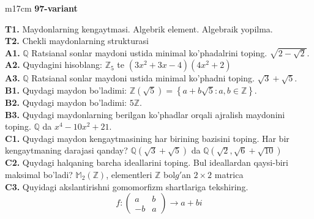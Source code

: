 \documentclass{article}
\begin{document}
\begin{tabular}{m{17cm}}
\textbf{97-variant}
\newline

\textbf{T1.} Maydonlarning kengaytmasi. Algebrik element. Algebraik yopilma. \\
\textbf{T2.} Chekli maydonlarning strukturasi \\
\textbf{A1.} \(\mathbb{Q}\) Ratsianal sonlar maydoni ustida minimal ko'phadalrini toping.
\(\sqrt{2 - \sqrt{2}}\). \\
\textbf{A2.} Quydagini hisoblang:
\(\mathbb{Z}_{5}\) te \(\left( 3x^{2} + 3x - 4 \right)\left( 4x^{2} + 2 \right)\) \\
\textbf{A3.} \(\mathbb{Q}\) Ratsianal sonlar maydoni ustida minimal ko'phadni toping.
\(\sqrt{3} + \sqrt{5}\). \\
\textbf{B1.} Quydagi maydon bo'ladimi:
\(\mathbb{Z}\left( \sqrt{5} \right) = \left\{ a + b\sqrt{5}:a,b \in \mathbb{Z} \right\}\). \\
\textbf{B2.} Quydagi maydon bo'ladimi:
\(5\mathbb{Z}\). \\
\textbf{B3.} Quydagi maydonlarning berilgan ko'phadlar orqali ajralish maydonini toping.
\(\mathbb{Q}\) da \(x^{4} - 10x^{2} + 21\). \\
\textbf{C1.} Quydagi maydon kengaytmasining har birining bazisini toping. Har bir kengaytmaning darajasi qanday?
\(\mathbb{Q}\left( \sqrt{3} + \sqrt{5} \right)\) da \(\mathbb{Q}\left( \sqrt{2},\sqrt{6} + \sqrt{10} \right)\) \\
\textbf{C2.} Quydagi halqaning barcha ideallarini toping. Bul ideallardan qaysi-biri maksimal bo'ladi?
\(\mathbb{M}_{2}\left( \mathbb{Z} \right)\), elementleri \(\mathbb{Z}\) bol\(g'\)an \(2 \times 2\) matrica \\
\textbf{C3.} Quyidagi akslantirishni gomomorfizm shartlariga tekshiring.
\[f:\begin{pmatrix}
a & b \\
 - b & a
\end{pmatrix} \rightarrow a + bi\] \\

\end{tabular}
\vspace{1cm}
\end{document}
